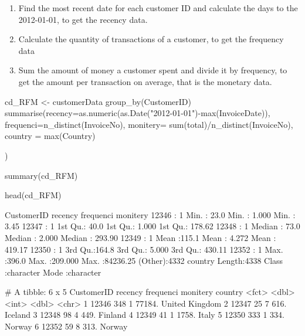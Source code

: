 \begin{enumerate}
\def\labelenumi{\arabic{enumi}.}
\tightlist
\item
  Find the most recent date for each customer ID and calculate the days
  to the 2012-01-01, to get the recency data.
\item
  Calculate the quantity of transactions of a customer, to get the
  frequency data
\item
  Sum the amount of money a customer spent and divide it by frequency,
  to get the amount per transaction on average, that is the monetary
  data.
\end{enumerate}

\begin{Schunk}
\begin{Sinput}
cd_RFM <- customerData %>% 
  group_by(CustomerID) %>% 
  summarise(recency=as.numeric(as.Date("2012-01-01")-max(InvoiceDate)),
            frequenci=n_distinct(InvoiceNo), monitery= sum(total)/n_distinct(InvoiceNo),
            country = max(Country)
      
            ) 

summary(cd_RFM)

head(cd_RFM)
\end{Sinput}
\begin{Soutput}
   CustomerID      recency        frequenci          monitery       
 12346  :   1   Min.   : 23.0   Min.   :  1.000   Min.   :    3.45  
 12347  :   1   1st Qu.: 40.0   1st Qu.:  1.000   1st Qu.:  178.62  
 12348  :   1   Median : 73.0   Median :  2.000   Median :  293.90  
 12349  :   1   Mean   :115.1   Mean   :  4.272   Mean   :  419.17  
 12350  :   1   3rd Qu.:164.8   3rd Qu.:  5.000   3rd Qu.:  430.11  
 12352  :   1   Max.   :396.0   Max.   :209.000   Max.   :84236.25  
 (Other):4332                                                       
   country         
 Length:4338       
 Class :character  
 Mode  :character  
                   
                   
                   
                   
# A tibble: 6 x 5
  CustomerID recency frequenci monitery country       
  <fct>        <dbl>     <int>    <dbl> <chr>         
1 12346          348         1   77184. United Kingdom
2 12347           25         7     616. Iceland       
3 12348           98         4     449. Finland       
4 12349           41         1    1758. Italy         
5 12350          333         1     334. Norway        
6 12352           59         8     313. Norway        
\end{Soutput}
\end{Schunk}

